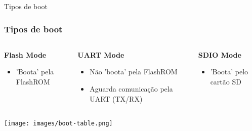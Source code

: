 \documentclass[10pt, compress]{beamer}
\begin{document}
\begin{frame}{Tipos de boot}
  \frametitle{Tipos de boot}
    \begin{columns}
      \begin{column}{0.38\textwidth}
        \begin{center}
          \textbf{Flash Mode}
            \begin{itemize}
              \item 'Boota' pela FlashROM
            \end{itemize}
        \end{center}
      \end{column}
      \begin{column}{0.38\textwidth}
        \begin{center}
          \textbf{UART Mode}
            \begin{itemize}
              \item Não 'boota' pela FlashROM
              \item Aguarda comunicação pela UART (TX/RX)
            \end{itemize}
        \end{center}
      \end{column}
      \begin{column}{0.38\textwidth}
        \begin{center}
          \textbf{SDIO Mode}
            \begin{itemize}
              \item 'Boota' pelo cartão SD
            \end{itemize}
        \end{center}
      \end{column}
    \end{columns}
    \vspace{40pt}
    \texttt{[image: images/boot-table.png]}\\
\end{frame}
\end{document}
